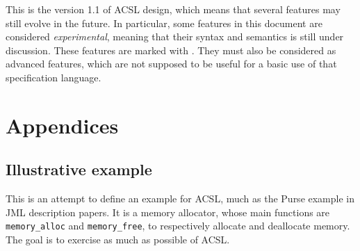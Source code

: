 \documentclass[a4paper,11pt,twoside,openright]{report}
\begin{document}
This is the version 1.1 of ACSL design, which means that several
features may still evolve in the future. In particular, some features
in this document are considered \emph{experimental}, meaning that
their syntax and semantics is still under discussion.  These features
are marked with \experimental.
They must also be considered as advanced features, which are not
supposed to be useful for a basic use of that specification language.









\appendix

\chapter{Appendices}
\label{chap:appendix}







\section{Illustrative example}

This is an attempt to define an example for ACSL, much as the Purse
example in JML description papers.  It is a memory allocator, whose
main functions are \verb|memory_alloc| and \verb|memory_free|, to
respectively allocate and deallocate memory.  The goal is to exercise
as much as possible of ACSL.



\cleardoublepage
{}

%


\cleardoublepage
{}
\listoffigures

\cleardoublepage
{}
\printindex
\end{document}
